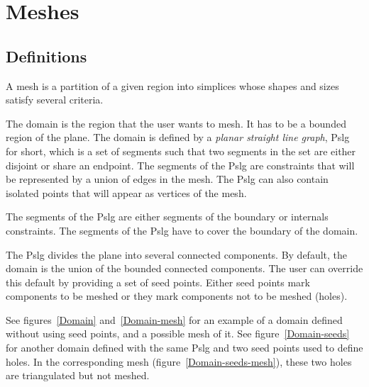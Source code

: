 \section{Meshes\label{sec:Mesh_2_meshes}}


\subsection{Definitions\label{sec:Mesh_2_meshes_definition}}

A mesh is a partition of a given region into simplices whose shapes
and sizes satisfy several criteria.

The domain is the region that the user wants to mesh. It has to be
  a bounded region of the plane. The domain is defined by a \emph{planar
  straight line graph}, {\sc Pslg} for short, which is a set of segments
  such that two segments in the set are either disjoint or share an
  endpoint. The segments of the {\sc Pslg} are constraints that will be
  represented by a union of edges in the mesh. The {\sc Pslg} can also
  contain isolated points that will appear as vertices of the mesh.

The segments of the {\sc Pslg} are either segments of the
boundary or internals constraints. The segments of the {\sc Pslg} have to
cover the boundary of the domain.

The {\sc Pslg} divides the plane into several connected components. By
default, the domain is the union of the bounded connected components. The
user can override this default by providing a set of seed points. Either
seed points mark components to be meshed or they mark components not to be
meshed (holes).

See figures~\ref{Domain} and~\ref{Domain-mesh} for an example of a domain
defined without using seed points, and a possible mesh of it. See
figure~\ref{Domain-seeds} for another domain defined with the same {\sc
  Pslg} and two seed points used to define holes. 
In the corresponding mesh (figure~\ref{Domain-seeds-mesh}), these
two holes are triangulated but not meshed.

